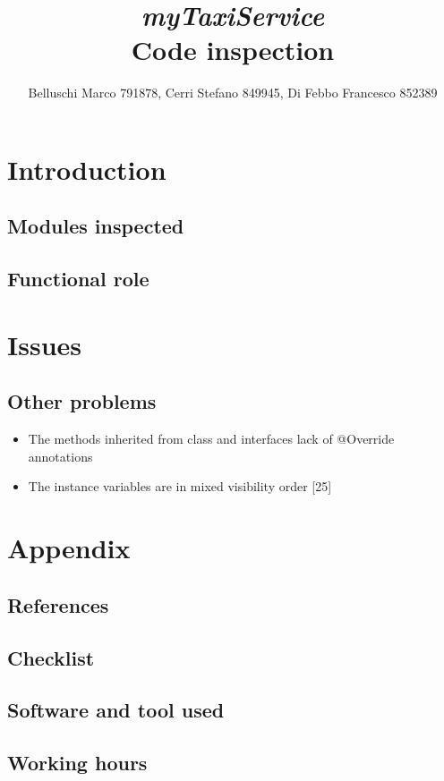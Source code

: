 \documentclass[]{report}
\title{{\Huge\textit{myTaxiService}}\\{\Large Code inspection}}
\author{Belluschi Marco 791878, Cerri Stefano 849945, Di Febbo Francesco 852389}
\begin{document}
\maketitle
\tableofcontents

\chapter{Introduction}

\section{Modules inspected}


\section{Functional role}


\chapter{Issues}




\section*{Other problems}
\begin{itemize}
	\item The methods inherited from class and interfaces lack of @Override annotations
	\item The instance variables are in mixed visibility order [25]
\end{itemize}

\appendix

\chapter{Appendix}

\section{References}


\section{Checklist}


\section{Software and tool used}


\section{Working hours}

\end{document}

